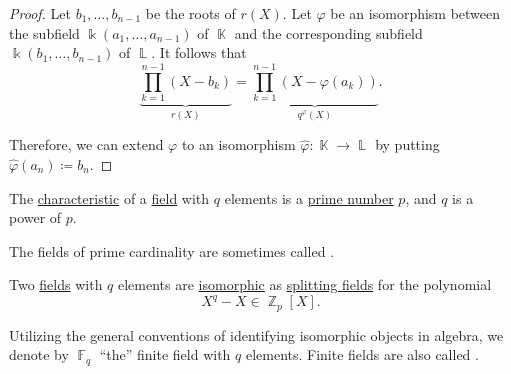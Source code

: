 \begin{proof}
  Let \( b_1, \ldots, b_{n-1} \) be the roots of \( r(X) \). Let \( \varphi \) be an isomorphism between the subfield \( \Bbbk(a_1, \ldots, a_{n-1}) \) of \( \BbbK \) and the corresponding subfield \( \Bbbk(b_1, \ldots, b_{n-1}) \) of \( \BbbL \). It follows that
  \begin{equation*}
    \underbrace{\prod_{k=1}^{n-1} (X - b_k)}_{r(X)} = \underbrace{\prod_{k=1}^{n-1} (X - \varphi(a_k))}_{q^\varphi(X)}.
  \end{equation*}

  Therefore, we can extend \( \varphi \) to an isomorphism \( \widehat{\varphi}: \BbbK \to \BbbL \) by putting \( \widehat{\varphi}(a_n) \coloneqq b_n \).
\end{proof}

\begin{theorem}\label{thm:finite_fields}
  \hfill
  \begin{thmenum}
     The \hyperref[def:ring_characteristic]{characteristic} of a \hyperref[def:field]{field} with \( q \) elements is a \hyperref[def:prime_number]{prime number} \( p \), and \( q \) is a power of \( p \).

    The fields of prime cardinality are sometimes called .

     Two \hyperref[def:field]{fields} with \( q \) elements are \hyperref[def:field/homomorphism]{isomorphic} as \hyperref[def:splitting_field]{splitting fields} for the polynomial
    \begin{equation*}
      X^q - X \in \BbbZ_p[X].
    \end{equation*}

    Utilizing the general conventions of identifying isomorphic objects in algebra, we denote by \( \BbbF_q \) \enquote{the} finite field with \( q \) elements. Finite fields are also called .
  \end{thmenum}
\end{theorem}
